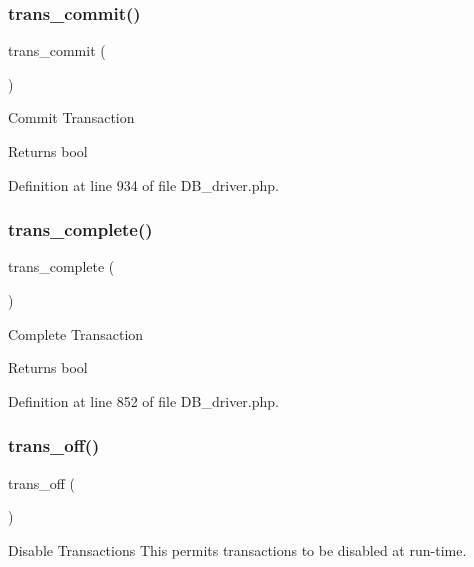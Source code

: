 \subsubsection{\texorpdfstring{trans\_commit()}{trans\_commit()}}
{\footnotesize\ttfamily trans\+\_\+commit (\begin{DoxyParamCaption}{ }\end{DoxyParamCaption})}

Commit Transaction

\begin{DoxyReturn}{Returns}
bool 
\end{DoxyReturn}


Definition at line 934 of file D\+B\+\_\+driver.\+php.

\mbox{\label{class_c_i___d_b__driver_aa0edd209de428801ce5faa1fe740852e}} 
\subsubsection{\texorpdfstring{trans\_complete()}{trans\_complete()}}
{\footnotesize\ttfamily trans\+\_\+complete (\begin{DoxyParamCaption}{ }\end{DoxyParamCaption})}

Complete Transaction

\begin{DoxyReturn}{Returns}
bool 
\end{DoxyReturn}


Definition at line 852 of file D\+B\+\_\+driver.\+php.

\mbox{\label{class_c_i___d_b__driver_ae9080ca6b0a9a258f5e87750b266e337}} 
\subsubsection{\texorpdfstring{trans\_off()}{trans\_off()}}
{\footnotesize\ttfamily trans\+\_\+off (\begin{DoxyParamCaption}{ }\end{DoxyParamCaption})}

Disable Transactions This permits transactions to be disabled at run-\/time.

